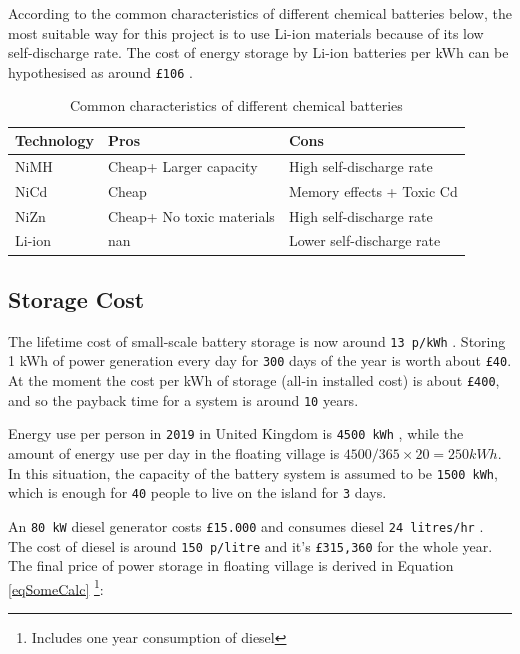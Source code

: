 \documentclass[11pt]{article}
\numberwithin{equation}{section}
\begin{document}
According to the common characteristics of different chemical batteries below, the most suitable way for this project is to use Li-ion materials because of its low self-discharge rate. The cost of energy storage by Li-ion batteries per kWh can be hypothesised as around \texttt{£106} \cite{123}.

\begin{table}[H]
\caption{\label{CharacteristicsOfBatteries}Common characteristics of different chemical batteries}
\centering
\begin{tabular}{lll}
\toprule
Technology & Pros\xa0 & Cons\\
\midrule
NiMH & Cheap+ Larger capacity & High self-discharge rate\\
NiCd & Cheap & Memory effects + Toxic Cd  \footnotemark\\
NiZn & Cheap+ No toxic materials & High self-discharge rate\\
Li-ion & nan & Lower self-discharge rate\\
\bottomrule
\end{tabular}
\end{table}
\subsection{Storage Cost}
\label{sec:org9e28785}
The lifetime cost of small-scale battery storage is now around \texttt{13 p/kWh} \cite{1234}. Storing 1 kWh of power generation every day for \texttt{300} days of the year is worth about \texttt{£40}. At the moment the cost per kWh of storage (all-in installed cost) is about \texttt{£400}, and so the payback time for a system is around \texttt{10} years.

Energy use per person in \texttt{2019} in United Kingdom is \texttt{4500 kWh} \cite{12345}, while the amount of energy use per day in the floating village is \(4500/365 \times 20 = 250 kWh\). In this situation, the capacity of the battery system is assumed to be \texttt{1500 kWh}, which is enough for \texttt{40} people to live on the island for \texttt{3} days.

An \texttt{80 kW} diesel generator costs \texttt{£15.000} \cite{123abc} and consumes diesel \texttt{24 litres/hr} \cite{123bcd}. The cost of diesel is around \texttt{150 p/litre} \cite{123cde} and it’s \texttt{£315,360} for the whole year. The final price of power storage in floating village is derived in Equation \ref{eqSomeCalc} \footnote{Includes one year consumption of diesel}:
\end{document}
